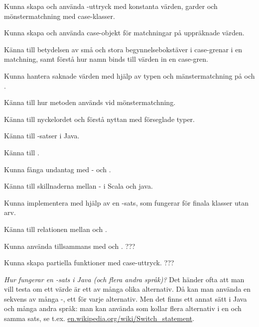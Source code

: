 

\Exercise{\ExeWeekNINE}\label{exe:W09}

\begin{Goals}
\item Kunna skapa och använda -uttryck med konstanta värden, garder och mönstermatchning med case-klasser.
\item Kunna skapa och använda case-objekt för matchningar på uppräknade värden.
\item Känna till betydelsen av små och stora begynnelsebokstäver i case-grenar i en matchning, samt förstå hur namn binds till värden in en case-gren.
\item Kunna hantera saknade värden med hjälp av typen  och mänstermatchning på  och . 
\item Känna till hur metoden  används vid mönstermatchning.
\item Känna till nyckelordet  och förstå nyttan med förseglade typer.
\item Känna till -satser i Java.
\item Känna till .
\item Kunna fånga undantag med - och .
\item Känna till skillnaderna mellan - i Scala och java.
\item Kunna implementera  med hjälp av en -sats, som fungerar för finala klasser utan arv.
\item Känna till relationen mellan  och .
\item Kunna använda  tillsammans med  och . ???
\item Kunna skapa partiella funktioner med case-uttryck. ???
\end{Goals}

\begin{Preparations}
\item {} 
\end{Preparations}

\BasicTasks %

\Task \label{task:switch} \emph{Hur fungerar en -sats i Java (och flera andra språk)?} Det händer ofta att man vill testa om ett värde är ett av många olika alternativ. Då kan man använda en sekvens av många -, ett för varje alternativ. Men det finns ett annat sätt i Java och många andra språk: man kan använda  som kollar flera alternativ i en och samma sats, se t.ex. \href{https://en.wikipedia.org/wiki/Switch_statement}{en.wikipedia.org/wiki/Switch\_statement}.

